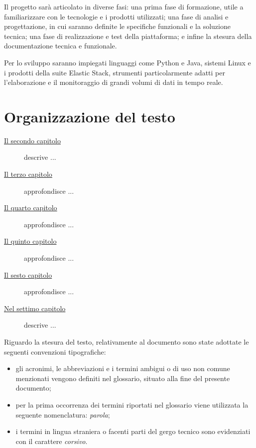 Il progetto sarà articolato in diverse fasi: una prima fase di formazione, utile a familiarizzare con le tecnologie e i prodotti utilizzati; una fase di analisi e progettazione, in cui saranno definite le specifiche funzionali e la soluzione tecnica; una fase di realizzazione e test della piattaforma; e infine la stesura della documentazione tecnica e funzionale. 

Per lo sviluppo saranno impiegati linguaggi come Python e Java, sistemi Linux e i prodotti della suite Elastic Stack, strumenti particolarmente adatti per l'elaborazione e il monitoraggio di grandi volumi di dati in tempo reale.


\section{Organizzazione del testo}

\begin{description}
    \item[{\hyperref[cap:processi-metodologie]{Il secondo capitolo}}] descrive ...
    
    \item[{\hyperref[cap:descrizione-stage]{Il terzo capitolo}}] approfondisce ...
    
    \item[{\hyperref[cap:analisi-requisiti]{Il quarto capitolo}}] approfondisce ...
    
    \item[{\hyperref[cap:progettazione-codifica]{Il quinto capitolo}}] approfondisce ...
    
    \item[{\hyperref[cap:verifica-validazione]{Il sesto capitolo}}] approfondisce ...
    
    \item[{\hyperref[cap:conclusioni]{Nel settimo capitolo}}] descrive ...
\end{description}

Riguardo la stesura del testo, relativamente al documento sono state adottate le seguenti convenzioni tipografiche:
\begin{itemize}
	\item gli acronimi, le abbreviazioni e i termini ambigui o di uso non comune menzionati vengono definiti nel glossario, situato alla fine del presente documento;
	\item per la prima occorrenza dei termini riportati nel glossario viene utilizzata la seguente nomenclatura: \emph{parola}\glsfirstoccur;
	\item i termini in lingua straniera o facenti parti del gergo tecnico sono evidenziati con il carattere \emph{corsivo}.
\end{itemize}
